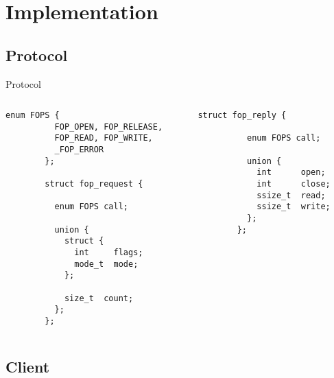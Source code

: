 \documentclass[handout]{beamer}
\begin{document}
\section{Implementation}

\subsection{Protocol}

\begin{frame}[fragile]{Protocol}
  \begin{columns}
    \begin{column}{0.5\textwidth}
      \begin{lstlisting}[gobble=8]
        enum FOPS {
          FOP_OPEN, FOP_RELEASE,
          FOP_READ, FOP_WRITE,
          _FOP_ERROR
        };

        struct fop_request {

          enum FOPS call;

          union {
            struct {
              int     flags;
              mode_t  mode;
            };

            size_t  count;
          };
        };
      \end{lstlisting}
    \end{column}
    \begin{column}{0.5\textwidth}
      \begin{lstlisting}[gobble=8]
        struct fop_reply {

          enum FOPS call;

          union {
            int      open;
            int      close;
            ssize_t  read;
            ssize_t  write;
          };
        };
      \end{lstlisting}
    \end{column}
  \end{columns}
\end{frame}

\subsection{Client}
\end{document}
